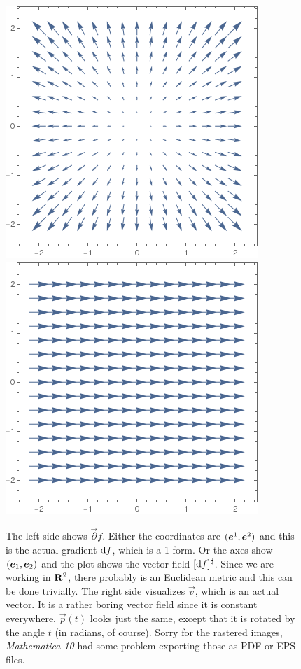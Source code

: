 \documentclass[11pt, english, fleqn, DIV=15, headinclude, BCOR=1cm]{scrartcl}
\begin{document}
\begin{figure}[htbp]
    \centering
    \includegraphics[width=.45\linewidth]{gradient.png}
    \hfill
    \includegraphics[width=.45\linewidth]{v.png}
    \caption{%
        The left side shows $\vec\partial f$. Either the coordinates are
        $(\boldsymbol{e}^1, \boldsymbol{e}^2)$ and this is the actual gradient $\mathop{}\!\mathrm d f$, which is a
        1-form. Or the axes show $(\boldsymbol{e}_1, \boldsymbol{e}_2)$ and the plot shows 
        the vector field $[\mathop{}\!\mathrm d f]^\sharp$. Since we are working in $\mathbf R^2$,
        there probably is an Euclidean metric and this can be done trivially.
        The right side visualizes $\vec v$, which is an actual vector. It is a
        rather boring vector field since it is constant everywhere. $\vec p(t)$
        looks just the same, except that it is rotated by the angle $t$ (in
        radians, of course).
        Sorry for the rastered images, \emph{Mathematica 10} had some problem
        exporting those as PDF or EPS files.
    }
    \label{fig:vector-fields}
\end{figure}
\end{document}
